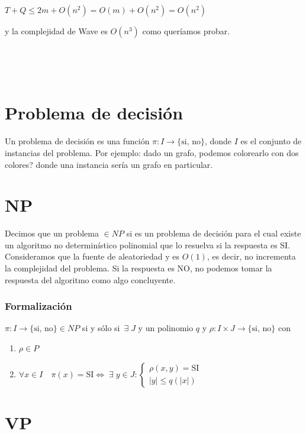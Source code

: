 \documentclass[10pt,a4paper]{article}
\begin{document}
\begin{center}
$T + Q \leq 2m + O(n^2) = O(m) + O(n^2) = O (n^2)$
\end{center}

y la complejidad de Wave es $O(n^3)$ como queríamos probar.

 

 

\section*{Problema de decisión}

Un problema de decisión es una función $\pi: I\rightarrow\{\text{si, no}\}$, donde $I$ es el conjunto de instancias del problema. Por ejemplo: dado un grafo, podemos colorearlo con dos colores? donde una instancia sería un grafo en particular.

\section*{NP}

Decimos que un problema $\in NP$ si es un problema de decisión para el cual existe un algoritmo no determinístico polinomial que lo resuelva si la respuesta es SI. Consideramos que la fuente de aleatoriedad y es $O(1)$, es decir, no incrementa la complejidad del problema. Si la respuesta es NO, no podemos tomar la respuesta del algoritmo como algo concluyente.

\subsubsection*{Formalización}

$\pi:I\rightarrow \{\text{si, no}\} \in NP$ si y sólo si $\exists\; J$ y un polinomio $q$ y $\rho: I \times J \rightarrow \{\text{si, no}\}$ con

\begin{enumerate}

	\item $\rho \in P$
	\item $\forall x \in I\quad\pi(x) = \text{SI} \Leftrightarrow\;
 \exists \;y \in J:
\begin{cases}
\rho(x, y) = \text{SI}\\
\lvert y \rvert \leq q(\lvert x \rvert)
\end{cases}$
\end{enumerate}

\section*{VP}
\end{document}
